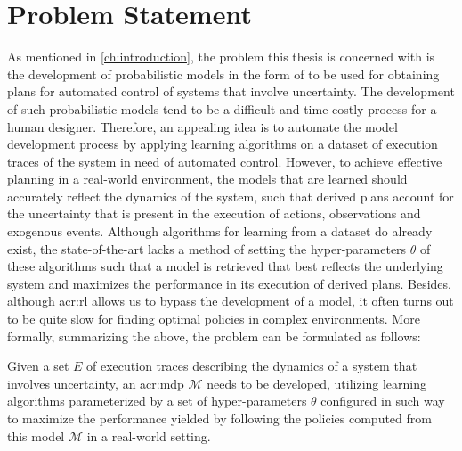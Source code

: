 \section{Problem Statement}
\label{sec:problem-statement}

As mentioned in \autoref{ch:introduction}, the problem this thesis is concerned with is the development of probabilistic models in the form of  to be used for obtaining plans for automated control of systems that involve uncertainty.
The development of such probabilistic models tend to be a difficult and time-costly process for a human designer.
Therefore, an appealing idea is to automate the model development process by applying learning algorithms on a dataset of execution traces of the system in need of automated control.
However, to achieve effective planning in a real-world environment, the models that are learned should accurately reflect the dynamics of the system, such that derived plans account for the uncertainty that is present in the execution of actions, observations and exogenous events.
Although algorithms for learning  from a dataset do already exist, the state-of-the-art lacks a method of setting the hyper-parameters $\theta$ of these algorithms such that a model is retrieved that best reflects the underlying system and maximizes the performance in its execution of derived plans.
Besides, although \acrfull{acr:rl} allows us to bypass the development of a model, it often turns out to be quite slow for finding optimal policies in complex environments.
More formally, summarizing the above, the problem can be formulated as follows:

\begin{problem}
	Given a set $E$ of execution traces describing the dynamics of a system that involves uncertainty, an \acrshort{acr:mdp} $\mathcal{M}$ needs to be developed, utilizing learning algorithms parameterized by a set of hyper-parameters $\theta$ configured in such way to maximize the performance yielded by following the policies computed from this model $\mathcal{M}$ in a real-world setting.
\end{problem}

